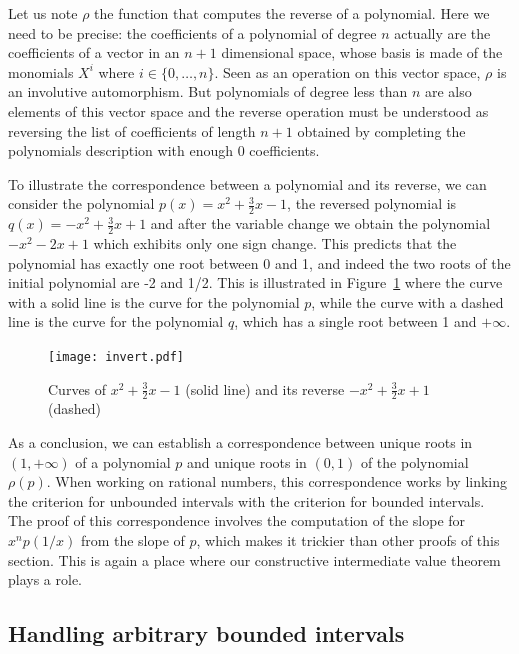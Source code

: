 \documentclass{mscs}
\begin{document}
Let us note \(\rho\) the function that computes the reverse of a
polynomial.  Here we need to be precise: the coefficients of a
polynomial of degree \(n\) actually are the coefficients of a vector
in an \(n+1\) dimensional space, whose basis is made of the monomials
\(X^i\) where \(i\in\{0,\dots, n\}\).  Seen as an operation on this vector
space, \(\rho\) is an involutive automorphism.  But
polynomials of degree less than \(n\) are also elements of this vector
space and the reverse operation must be understood as reversing the
list of coefficients of length \(n+1\) obtained by completing the
polynomials description with enough 0 coefficients.


To illustrate the correspondence between a polynomial and its reverse,
we can consider the polynomial \(p(x) = x^2 + \frac{3}{2} x - 1\),
the reversed polynomial is \(q(x) = -x^2 + \frac{3}{2}x + 1\) and after
the variable change we obtain the polynomial \(-x^2-2x+1\)
which exhibits only one sign change.  This predicts that the polynomial has
exactly one root between 0 and 1, and indeed the two roots of the initial
polynomial are -2 and 1/2.  This is illustrated in
Figure~\ref{invert} where the curve with a solid line is the curve for the
polynomial \(p\), while the curve with a dashed line is the curve for
the polynomial \(q\), which has a single root between 1 and \(+\infty\).
\begin{figure}
\begin{center}
\texttt{[image: invert.pdf]}
\end{center}
\caption{\label{invert} Curves of \(x^2+\frac{3}{2}x-1\) (solid line)
and its reverse \(-x^2 + \frac{3}{2} x + 1\) (dashed)}
\end{figure}

As a conclusion, we can establish a correspondence between unique
roots in \((1,+\infty)\) of a polynomial \(p\) and unique roots in
\((0,1)\) of the polynomial \(\rho(p)\).  When working on rational numbers, this
correspondence works by linking the criterion for unbounded intervals
with the criterion for bounded intervals.  The proof of this
correspondence
involves the
computation of the slope for \(x^np(1/x)\) from the slope of \(p\),
which makes it trickier than other proofs of this section.  This is again a place where
our constructive intermediate value theorem plays a role.

\subsection{Handling arbitrary bounded intervals}
\end{document}
